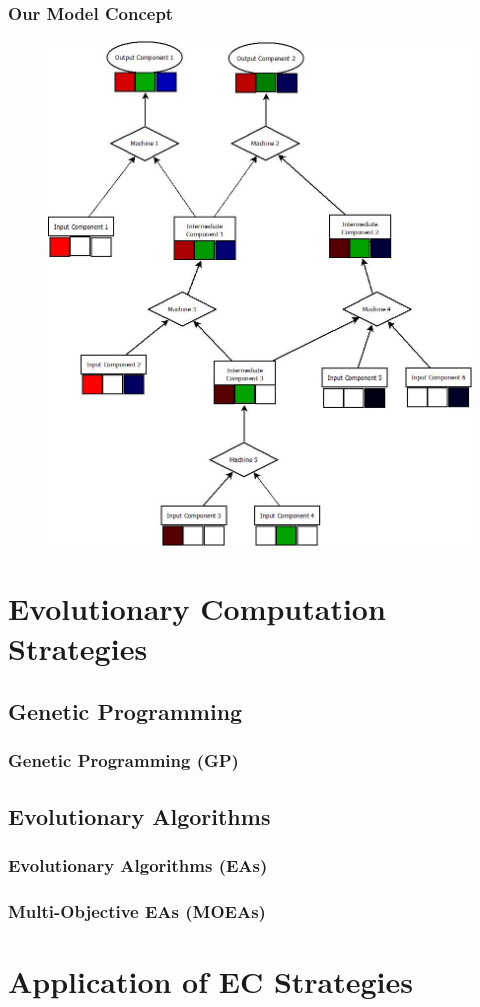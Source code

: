 \documentclass{beamer}
\begin{document}
\begin{frame}
\frametitle{Our Model Concept}
\begin{figure}
\includegraphics[width=0.5\linewidth]{BaseModel.jpeg}
\end{figure}
\end{frame}

\section{Evolutionary Computation Strategies}

\subsection{Genetic Programming}

\begin{frame}
\frametitle{Genetic Programming (GP)}

\end{frame}

\subsection{Evolutionary Algorithms}

\begin{frame}
\frametitle{Evolutionary Algorithms (EAs)}

\end{frame}

\begin{frame}
\frametitle{Multi-Objective EAs (MOEAs)}

\end{frame}

\section{Application of EC Strategies}
\end{document}
